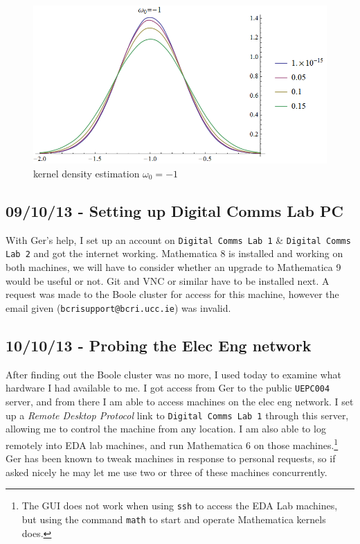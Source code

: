 \begin{figure}[htbp]
\centering
\includegraphics{../plots/fyp1_w0_kde.png}
\caption{kernel density estimation $\omega_0=-1$}
\end{figure}

\subsection{09/10/13 - Setting up Digital Comms Lab PC}

With Ger's help, I set up an account on \texttt{Digital Comms Lab 1} \&
\texttt{Digital Comms Lab 2} and got the internet working. Mathematica 8
is installed and working on both machines, we will have to consider
whether an upgrade to Mathematica 9 would be useful or not. Git and VNC
or similar have to be installed next. A request was made to the Boole
cluster for access for this machine, however the email given
(\texttt{bcrisupport@bcri.ucc.ie}) was invalid.

\subsection{10/10/13 - Probing the Elec Eng network}

After finding out the Boole cluster was no more, I used today to examine
what hardware I had available to me. I got access from Ger to the public
\texttt{UEPC004} server, and from there I am able to access machines on
the elec eng network. I set up a \emph{Remote Desktop Protocol} link to
\texttt{Digital Comms Lab 1} through this server, allowing me to control
the machine from any location. I am also able to log remotely into EDA
lab machines, and run Mathematica 6 on those machines.\footnote{The GUI
  does not work when using \texttt{ssh} to access the EDA Lab machines,
  but using the command \texttt{math} to start and operate Mathematica
  kernels does.} Ger has been known to tweak machines in response to
personal requests, so if asked nicely he may let me use two or three of
these machines concurrently.

